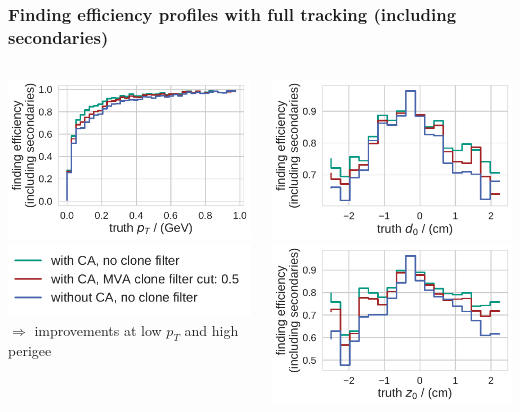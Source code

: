 \documentclass[18pt, aspectratio=169]{beamer}
\begin{document}
\begin{frame}
  \frametitle{Finding efficiency profiles with full tracking (including secondaries)}
  \begin{columns}
    \begin{column}{.5\textwidth}
      \centering
      \includegraphics[width=.7\textwidth]{figures/findeff_secondaries_by_pt_truth_fullreco.pdf}\\
      \includegraphics[width=.7\textwidth]{figures/legend_fom_profile.pdf}\\
      $\Rightarrow$ improvements at low $p_T$ and high perigee
    \end{column}    
    \begin{column}{.5\textwidth}
      \centering
      \includegraphics[width=.7\textwidth]{figures/findeff_secondaries_by_d0_truth_fullreco.pdf}\\
      \includegraphics[width=.7\textwidth]{figures/findeff_secondaries_by_z0_truth_fullreco.pdf}
    \end{column}
  \end{columns}
\end{frame}
\end{document}
